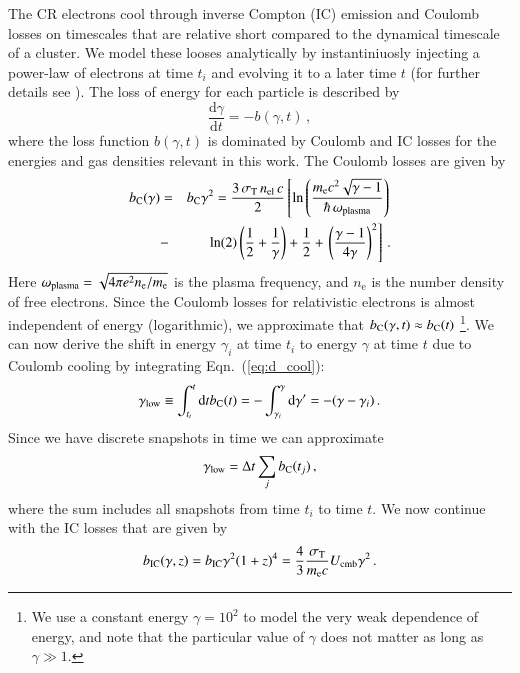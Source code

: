\documentclass[useAMS,usenatbib]{mn2e}
\newcommand{\dd}{\mathrm{d}}
\newcommand{\e}{\mathrm{e}}
\newcommand{\IC}{\mathrm{IC}}
\newcommand{\low}{\mathrm{low}}
\newcommand{\gam}{\gamma}
\begin{document}
The CR electrons cool through inverse Compton (IC) emission and
Coulomb losses on timescales that are relative short compared to the
dynamical timescale of a cluster. We model these looses analytically
by instantiniuosly injecting a power-law of electrons at time $t_i$
and evolving it to a later time $t$ (for further details see
\citep{1999ApJ...520..529S}). The loss of energy for each particle is
described by
\begin{equation}
\label{eq:d_cool}
\frac{\dd \gam}{\dd t} = - b(\gam,t)\,,
\end{equation}
where the loss function $b(\gam,t)$ is dominated by Coulomb and IC
losses for the energies and gas densities relevant in this work. The
Coulomb losses are given by
\begin{eqnarray}
  \label{eq:b_C}
  b_\rmn{C}(\gam) &=& b_\rmn{C} \gam^2 
  = \frac{3\,\sigma_\rmn{T}\,n_\rmn{el}\,c}{2}
  \left[\ln\left(\frac{m_\e c^2 \sqrt{\gam-1}}{\hbar\,\omega_\rmn{plasma}}\right)\right.\nonumber \\
    &-&\ln(2)\left(\frac{1}{2}+\frac{1}{\gam}\right)+\frac{1}{2}+
    \left.\left(\frac{\gam-1}{4\gam}\right)^2\right]\,.
\end{eqnarray}
Here $\omega_\rmn{plasma} = \sqrt{4\pi e^2 n_\e / m_\e}$ is the plasma
frequency, and $n_\e$ is the number density of free electrons. Since
the Coulomb losses for relativistic electrons is almost independent of
energy (logarithmic), we approximate that $b_\rmn{C}(\gam,t)\approx
b_\rmn{C}(t)$ \footnote{We use a constant energy $\gamma=10^2$ to
  model the very weak dependence of energy, and note that the
  particular value of $\gamma$ does not matter as long as
  $\gamma\gg1$.}. We can now derive the shift in energy $\gam_i$ at
time $t_i$ to energy $\gam$ at time $t$ due to Coulomb cooling by
integrating Eqn.~(\ref{eq:d_cool}):
\begin{eqnarray}
  \label{eq:gamma_low}
  \gam_\low \equiv\int_{t_i}^{t}\dd t b_\rmn{C}(t) = 
  -\int_{\gam_i}^{\gam}\dd \gam' = -(\gam-\gam_i)\,.
\end{eqnarray}
Since we have discrete snapshots in time we can approximate 
\begin{eqnarray}
  \label{eq:gamma_low_sum}
  \gam_\low = \Delta t \sum_j b_\rmn{C}(t_j)\,,
\end{eqnarray}
where the sum includes all snapshots from time $t_i$ to time $t$. We
now continue with the IC losses that are given by
\begin{equation}
  \label{eq:b_IC}
  b_\IC(\gam,z) = b_\IC \gam^2 (1+z)^4
  = \frac{4}{3}\frac{\sigma_\rmn{T}}{m_\e c} U_\rmn{cmb} \gam^2\,.
\end{equation}
\end{document}
